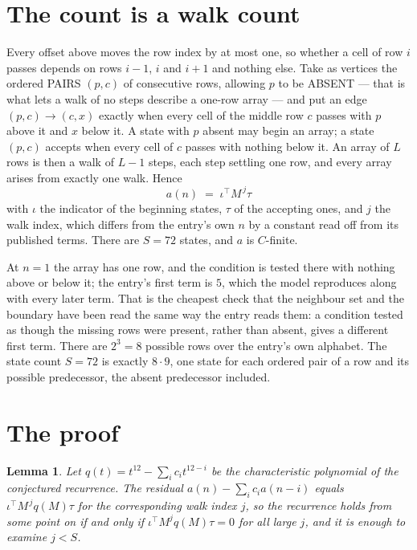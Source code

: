 \documentclass[11pt,a4paper]{article}
\theoremstyle{plain}
\newtheorem{lemma}[theorem]{Lemma}
\theoremstyle{definition}
\begin{document}
\section{The count is a walk count}

Every offset above moves the row index by at most one, so whether a cell of row $i$ passes
depends on rows $i-1$, $i$ and $i+1$ and nothing else. Take as vertices the ordered PAIRS
$(p,c)$ of consecutive rows, allowing $p$ to be ABSENT --- that is what lets a walk of no steps
describe a one-row array --- and put an edge $(p,c)\to(c,x)$ exactly when every cell of the
middle row $c$ passes with $p$ above it and $x$ below it. A state with $p$ absent may begin an
array; a state $(p,c)$ accepts when every cell of $c$ passes with nothing below it. An array of
$L$ rows is then a walk of $L-1$ steps, each step settling one row, and every array arises from
exactly one walk. Hence
\[
a(n)\;=\;\iota^{\!\top}M^{\,j}\tau
\]
with $\iota$ the indicator of the beginning states, $\tau$ of the accepting ones, and $j$ the
walk index, which differs from the entry's own $n$ by a constant read off from its published
terms. There are $S=72$ states, and $a$ is $C$-finite.

At $n=1$ the array has one row, and
the condition is tested there with nothing above or below it; the entry's first term is
$5$, which the model reproduces along with every later term. That is the cheapest check
that the neighbour set and the boundary have been read the same way the entry reads them: a
condition tested as though the missing rows were present, rather than absent, gives a different
first term. There are $2^{3}=8$ possible rows over the entry's own alphabet. The state count $S=72$ is exactly $8\cdot9$,
one state for each ordered pair of a row and its possible predecessor, the absent predecessor
included.

\section{The proof}

\begin{lemma}\label{lem:crit}
Let $q(t)=t^{12}-\sum_i c_it^{12-i}$ be the characteristic polynomial of the
conjectured recurrence. The residual $a(n)-\sum_ic_ia(n-i)$ equals
$\iota^{\!\top}M^{\,j}q(M)\tau$ for the corresponding walk index $j$, so the recurrence
holds from some point on if and only if $\iota^{\!\top}M^{j}q(M)\tau=0$ for all large $j$,
and it is enough to examine $j<S$.
\end{lemma}
\end{document}

